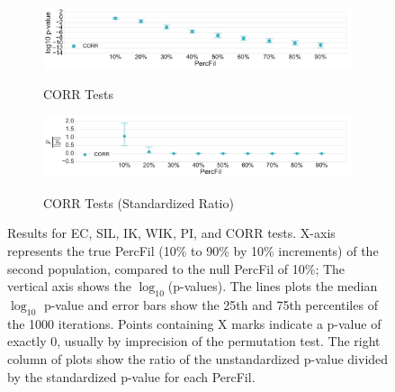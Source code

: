 \documentclass[12pt]{article}
\begin{document}
\begin{center}
\begin{figure}[htp!]
\begin{subfigure}{.48\textwidth}
        \label{fig:all_weight_normed}
      \end{subfigure}
      \begin{subfigure}{.48\textwidth}
        \caption{CORR Tests}
        \includegraphics[width=\linewidth, height = .75in]{figure_8_all_correlation_group.pdf}
        \label{fig:all_corr}
      \end{subfigure}
      \begin{subfigure}{.48\textwidth}
        \caption{CORR Tests (Standardized Ratio)}
        \includegraphics[width=\linewidth, height = .75in]{figure_8_joint_all_correlation_group.pdf}
        \label{fig:all_corr_normed}
      \end{subfigure}
      \caption{Results for EC, SIL, IK, WIK, PI, and CORR tests. X-axis represents the true PercFil (10\% to 90\% by 10\% increments) of the second population, compared to the null PercFil of 10\%; The vertical axis shows the $\log_{10}$(p-values). The lines plots the median $\log_{10}$ p-value and error bars show the 25th and 75th percentiles of the 1000 iterations. Points containing X marks indicate a p-value of exactly 0, usually by imprecision of the permutation test. The right column of plots show the ratio of the unstandardized p-value divided by the standardized p-value for each PercFil.  
      }
      \label{fig:linesUnnormApp}
    \end{figure}
  \end{center}





\end{document}
